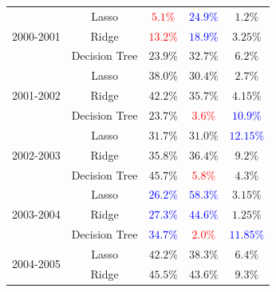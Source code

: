 \documentclass[11pt]{article}
\begin{document}
{\begin{table}[p]
\begin{tabular}{|c|c|c|c|c|}
      \hline
      \multirow{3}{*}{2000-2001} & Lasso         & \textcolor{red}{$5.1\%$}   & \textcolor{blue}{$24.9\%$} & $1.2\%$                     \\
      \cline{2-5}
                                 & Ridge         & \textcolor{red}{$13.2\%$}  & \textcolor{blue}{$18.9\%$} & $3.25\%$                    \\
      \cline{2-5}
                                 & Decision Tree & $23.9\%$                   & $32.7\%$                   & $6.2\%$                     \\
      \hline
      \multirow{3}{*}{2001-2002} & Lasso         & $38.0\%$                   & $30.4\%$                   & $2.7\%$                     \\
      \cline{2-5}
                                 & Ridge         & $42.2\%$                   & $35.7\%$                   & $4.15\%$                    \\
      \cline{2-5}
                                 & Decision Tree & $23.7\%$                   & \textcolor{red}{$3.6\%$}   & \textcolor{blue}{$10.9\%$}  \\
      \hline
      \multirow{3}{*}{2002-2003} & Lasso         & $31.7\%$                   & $31.0\%$                   & \textcolor{blue}{$12.15\%$} \\
      \cline{2-5}
                                 & Ridge         & $35.8\%$                   & $36.4\%$                   & $9.2\%$                     \\
      \cline{2-5}
                                 & Decision Tree & $45.7\%$                   & \textcolor{red}{$5.8\%$}   & $4.3\%$                     \\
      \hline
      \multirow{3}{*}{2003-2004} & Lasso         & \textcolor{blue}{$26.2\%$} & \textcolor{blue}{$58.3\%$} & $3.15\%$                    \\
      \cline{2-5}
                                 & Ridge         & \textcolor{blue}{$27.3\%$} & \textcolor{blue}{$44.6\%$} & $1.25\%$                    \\
      \cline{2-5}
                                 & Decision Tree & \textcolor{blue}{$34.7\%$} & \textcolor{red}{$2.0\%$}   & \textcolor{blue}{$11.85\%$} \\
      \hline
      \multirow{3}{*}{2004-2005} & Lasso         & $42.2\%$                   & $38.3\%$                   & $6.4\%$                     \\
      \cline{2-5}
                                 & Ridge         & $45.5\%$                   & $43.6\%$                   & $9.3\%$                     \\

\end{tabular}
\end{table}}
\end{document}
